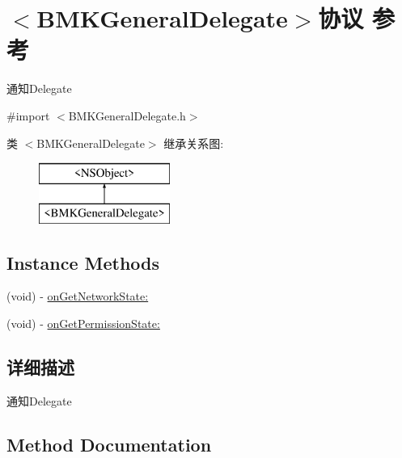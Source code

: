 \hypertarget{protocol_b_m_k_general_delegate-p}{}\section{$<$B\+M\+K\+General\+Delegate$>$协议 参考}
\label{protocol_b_m_k_general_delegate-p}


通知\+Delegate  




{\ttfamily \#import $<$B\+M\+K\+General\+Delegate.\+h$>$}

类 $<$B\+M\+K\+General\+Delegate$>$ 继承关系图\+:\begin{figure}[H]
\begin{center}
\leavevmode
\includegraphics[height=2.000000cm]{protocol_b_m_k_general_delegate-p}
\end{center}
\end{figure}
\subsection*{Instance Methods}
\begin{DoxyCompactItemize}
\item 
(void) -\/ \hyperlink{protocol_b_m_k_general_delegate-p_ad30d0a4dc9bb54cda10cb892ed769491}{on\+Get\+Network\+State\+:}
\item 
(void) -\/ \hyperlink{protocol_b_m_k_general_delegate-p_ab0c34f007a8be34196fc81f2c7b3cddb}{on\+Get\+Permission\+State\+:}
\end{DoxyCompactItemize}


\subsection{详细描述}
通知\+Delegate 

\subsection{Method Documentation}
\hypertarget{protocol_b_m_k_general_delegate-p_ad30d0a4dc9bb54cda10cb892ed769491}{}
